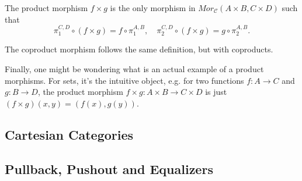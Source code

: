 \begin{theorem}
	The product morphism $f\times g$ is the only morphism in $Mor_\mathcal C (A\times B, C \times D)$
	such that
	\begin{displaymath}
		\pi_1^{C,D} \circ (f\times g) = f \circ \pi_1^{A,B}, \quad
		\pi_2^{C,D} \circ (f\times g) = g \circ \pi_2^{A,B}.
	\end{displaymath}
\end{theorem}

The coproduct morphism follows the same definition, but with coproducts.

Finally, one might be wondering what is an actual example of a product morphisms.
For sets, it's the intuitive object, e.g. for two functions $f:A \to C$
and $g:B \to D$, the product morphism $f\times g:A\times B \to C \times D$
is just $(f\times g) (x,y) = (f(x), g(y))$.

\subsection{Cartesian Categories}

\subsection{Pullback, Pushout and Equalizers}
